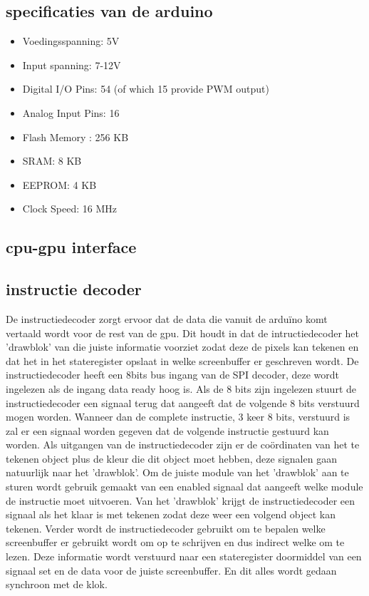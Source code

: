 \documentclass{scrartcl}
\begin{document}
\subsection {specificaties van de arduino}
\begin {itemize}
\item Voedingsspanning:	 5V
\item Input spanning: 	7-12V
\item Digital I/O Pins: 	54 (of which 15 provide PWM output)
\item Analog Input Pins:	16
\item Flash Memory	:	256 KB 
\item SRAM:			8 KB
\item EEPROM:		4 KB
\item Clock Speed:		16 MHz

\end {itemize}

\subsection { cpu-gpu interface}
\begin {itemize}
\end {itemize}

\subsection { instructie decoder}

De instructiedecoder zorgt ervoor dat de data die vanuit de arduïno komt vertaald wordt voor de rest van de gpu. 
Dit houdt in dat de intructiedecoder het 'drawblok' van die juiste informatie voorziet zodat deze de pixels kan tekenen en dat het in het stateregister opslaat in welke screenbuffer er geschreven wordt.
De instructiedecoder heeft een 8bits bus ingang van de SPI decoder, deze wordt ingelezen als de ingang data ready hoog is. Als de 8 bits zijn ingelezen stuurt de instructiedecoder een signaal terug dat aangeeft dat de volgende 8 bits verstuurd mogen worden.
Wanneer dan de complete instructie, 3 keer 8 bits, verstuurd is zal er een signaal worden gegeven dat de volgende instructie gestuurd kan worden.
Als uitgangen van de instructiedecoder zijn er de coördinaten van het te tekenen object plus de kleur die dit object moet hebben, deze signalen gaan natuurlijk naar het 'drawblok'.
Om de juiste module van het 'drawblok' aan te sturen wordt gebruik gemaakt van een enabled signaal dat aangeeft welke module de instructie moet uitvoeren.
Van het 'drawblok' krijgt de instructiedecoder een signaal als het klaar is met tekenen zodat deze weer een volgend object kan tekenen. 
Verder wordt de instructiedecoder gebruikt om te bepalen welke screenbuffer er gebruikt wordt om op te schrijven en dus indirect welke om te lezen. Deze informatie wordt verstuurd naar een stateregister doormiddel van een signaal set en de data voor de juiste screenbuffer.
En dit alles wordt gedaan synchroon met de klok.
\end{document}
